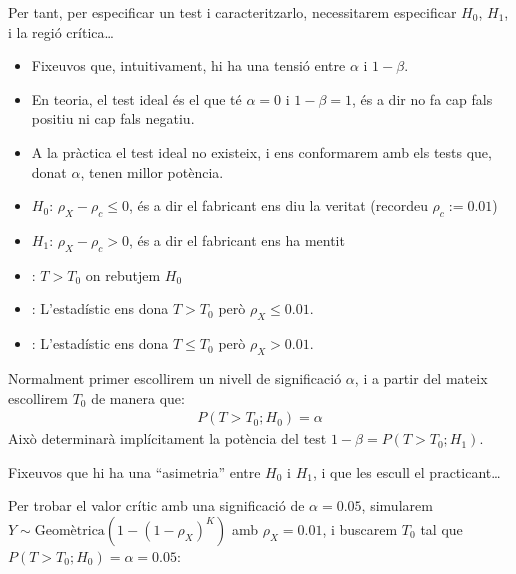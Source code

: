 \documentclass[letterpaper,10pt,english]{sphinxmanual}
\begin{document}
Per tant, per especificar un test i caracteritzar\sphinxhyphen{}lo, necessitarem especificar \(H_0\),
\(H_1\), i la regió crítica…
\begin{itemize}
\item {} 
Fixeu\sphinxhyphen{}vos que, intuitivament, hi ha una tensió entre \(\alpha\) i \(1- \beta\).

\item {} 
En teoria, el test ideal és el que té \(\alpha=0\) i \(1 - \beta = 1\), és a dir no fa cap fals positiu ni cap fals negatiu.

\item {} 
A la pràctica el test ideal no existeix, i ens conformarem amb els tests que, donat \(\alpha\), tenen millor potència.

\end{itemize}
\begin{itemize}
\item {} 
\(H_0\): \(\rho_X - \rho_c \leq 0\), és a dir el fabricant ens diu la veritat (recordeu \(\rho_c:=0.01\))

\item {} 
\(H_1\): \(\rho_X - \rho_c > 0\), és a dir el fabricant ens ha mentit

\item {} 
: \(T > T_0\) on rebutjem \(H_0\)

\item {} 
: L’estadístic ens dona \(T > T_0\) però \(\rho_X \leq 0.01\).

\item {} 
: L’estadístic ens dona \(T \leq T_0\) però \(\rho_X > 0.01\).

\end{itemize}

Normalment primer escollirem un nivell de significació \(\alpha\), i a partir del mateix
escollirem \(T_0\) de manera que:
\begin{equation*}
\begin{split}P(T > T_0 ; H_0) = \alpha\end{split}
\end{equation*}
Això determinarà implícitament la potència del test \(1 - \beta = P(T > T_0 ; H_1)\).

Fixeu\sphinxhyphen{}vos que hi ha una “asimetria” entre \(H_0\) i \(H_1\), i que les escull el practicant…

Per trobar el valor crític amb una significació de \(\alpha=0.05\),
simularem \(Y \sim \mbox{Geomètrica}(1 - (1-\rho_X)^K)\) amb \(\rho_X=0.01\),
i buscarem \(T_0\) tal que \(P(T > T_0 ; H_0) = \alpha = 0.05\):
\end{document}
